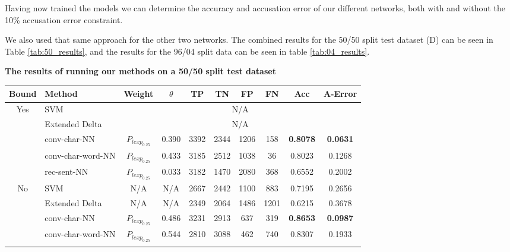 Having now trained the models we can determine the accuracy and accusation
error of our different networks, both with and without the 10\% accusation error
constraint.

We also used that same approach for the other two networks. The combined
results for the 50/50 split test dataset (D) can be seen in Table
\ref{tab:50_results}, and the results for the 96/04 split data can be seen in
table \ref{tab:04_results}.

\begin{table}[]
\centering
\textbf{The results of running our methods on a 50/50 split test dataset}\par\medskip
\begin{tabular}{|c|l|c|c|c|c|c|c|c|c|}
\hline
Bound                & Method                  & Weight            & $\theta$ & TP  & TN  & FP  & FN  & Acc             & A-Error         \\ \hline
\multirow{5}{*}{Yes} & SVM                     & \multicolumn{8}{c|}{N/A}                                                                     \\ \cline{2-10} 
                     & Extended Delta          & \multicolumn{8}{c|}{N/A}                                                                     \\ \cline{2-10} 
                     & \gls{conv-char-NN}      & $P_{lexp_{0.25}}$ & 0.390    & 3392 & 2344 & 1206 & 158  & \textbf{0.8078} & \textbf{0.0631} \\ \cline{2-10} 
                     & \gls{conv-char-word-NN} & $P_{lexp_{0.25}}$ & 0.433    & 3185 & 2512 & 1038 & 36   & 0.8023          & 0.1268          \\ \cline{2-10} 
                     & \gls{rec-sent-NN}       & $P_{lexp_{0.25}}$ & 0.033    & 3182 & 1470 & 2080 & 368  & 0.6552          & 0.2002          \\ \hline\hline
\multirow{5}{*}{No}  & SVM                     & N/A               & N/A      & 2667 & 2442 & 1100 & 883  & 0.7195          & 0.2656          \\ \cline{2-10} 
                     & Extended Delta          & N/A               & N/A      & 2349 & 2064 & 1486 & 1201 & 0.6215          & 0.3678          \\ \cline{2-10} 
                     & \gls{conv-char-NN}      & $P_{lexp_{0.25}}$ & 0.486    & 3231 & 2913 & 637  & 319  & \textbf{0.8653} & \textbf{0.0987} \\ \cline{2-10} 
                     & \gls{conv-char-word-NN} & $P_{lexp_{0.25}}$ & 0.544    & 2810 & 3088 & 462  & 740  & 0.8307          & 0.1933          \\ \cline{2-10} 

\end{tabular}
\end{table}
